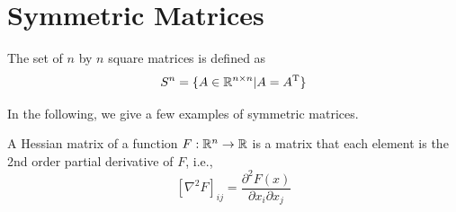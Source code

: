 \section{Symmetric Matrices}
\begin{definition}
The set of $n$ by $n$ square matrices is defined as
$$S^n = \{A\in \mathbb{R}^{n\times n} | A = A^{{\rm T}} \}$$
\end{definition}



In the following, we give a few examples of symmetric matrices.

\begin{example}
A Hessian matrix of a function $F:\mathbb{R}^n\to \mathbb{R}$ is a matrix that each element is the 2nd order partial derivative of $F$, i.e.,
$$[\nabla^2 F]_{ij} = \frac{\partial^2 F(x)}{\partial x_i \partial x_j}$$
\end{example}

